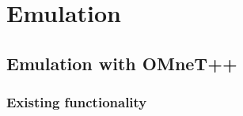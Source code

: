 \chapter{Emulation}
\label{cha:emulation}

\section{Emulation with OMneT++}
\label{sec:emulation_omnet}

\subsection{Existing functionality}
\label{sec:emulation_omnet_existing}